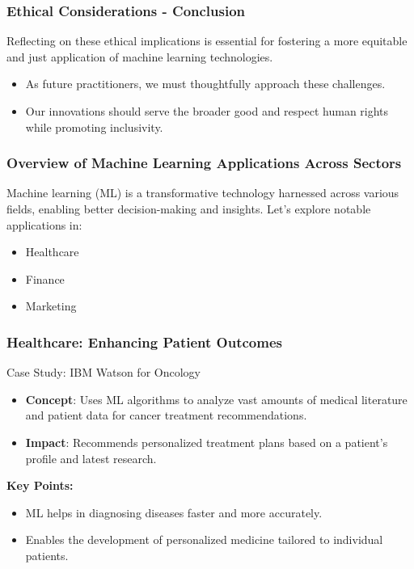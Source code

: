 \documentclass[aspectratio=169]{beamer}
\begin{document}
\begin{frame}[fragile]
    \frametitle{Ethical Considerations - Conclusion}
    Reflecting on these ethical implications is essential for fostering a more equitable and just application of machine learning technologies.  
    \begin{itemize}
        \item As future practitioners, we must thoughtfully approach these challenges.
        \item Our innovations should serve the broader good and respect human rights while promoting inclusivity.
    \end{itemize}
\end{frame}

\begin{frame}[fragile]
    \frametitle{Overview of Machine Learning Applications Across Sectors}
    Machine learning (ML) is a transformative technology harnessed across various fields, enabling better decision-making and insights. Let's explore notable applications in:
    \begin{itemize}
        \item Healthcare
        \item Finance
        \item Marketing
    \end{itemize}
\end{frame}

\begin{frame}[fragile]
    \frametitle{Healthcare: Enhancing Patient Outcomes}
    \begin{block}{Case Study: IBM Watson for Oncology}
        \begin{itemize}
            \item \textbf{Concept}: Uses ML algorithms to analyze vast amounts of medical literature and patient data for cancer treatment recommendations.
            \item \textbf{Impact}: Recommends personalized treatment plans based on a patient's profile and latest research.
        \end{itemize}
    \end{block}
    
    \textbf{Key Points:}
    \begin{itemize}
        \item ML helps in diagnosing diseases faster and more accurately.
        \item Enables the development of personalized medicine tailored to individual patients.
    \end{itemize}
\end{frame}
\end{document}
